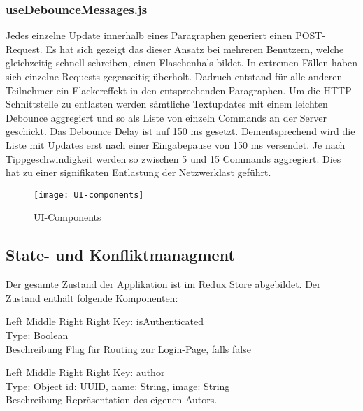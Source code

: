 \subsubsection*{useDebounceMessages.js}
Jedes einzelne Update innerhalb eines Paragraphen generiert einen POST-Request.
Es hat sich gezeigt das dieser Ansatz bei mehreren Benutzern, welche gleichzeitig schnell schreiben, einen Flaschenhals bildet.
In extremen Fällen haben sich einzelne Requests gegenseitig überholt.
Dadruch entstand für alle anderen Teilnehmer ein Flackereffekt in den entsprechenden Paragraphen.
Um die HTTP-Schnittstelle zu entlasten werden sämtliche Textupdates mit einem leichten Debounce aggregiert und so als Liste von einzeln Commands an der Server geschickt.
Das Debounce Delay ist auf 150 ms gesetzt.
Dementsprechend wird die Liste mit Updates erst nach einer Eingabepause von 150 ms versendet.
Je nach Tippgeschwindigkeit werden so zwischen 5 und 15 Commands aggregiert.
Dies hat zu einer signifikaten Entlastung der Netzwerklast geführt.

\begin{figure}[H]
    \centering
    \texttt{[image: UI-components]}
    \caption{UI-Components}
    \label{fig: UI-Components}
\end{figure}

\subsection{State- und Konfliktmanagment}
Der gesamte Zustand der Applikation ist im Redux Store abgebildet.
Der Zustand enthält folgende Komponenten:

\begin{tabbing}
    Left \= Middle \= Right \= Right \kill
    Key:  \> \> \> isAuthenticated\\
    Type:  \> \> \> Boolean \\
    Beschreibung \>  \> \> Flag für Routing zur Login-Page, falls false\\
\end{tabbing}

\begin{tabbing}
    Left \= Middle \= Right \= Right \kill
    Key:  \> \> \> author\\
    Type:  \> \> \> Object {id: UUID, name: String, image: String} \\
    Beschreibung \>  \> \> Repräsentation des eigenen Autors.\\
\end{tabbing}

